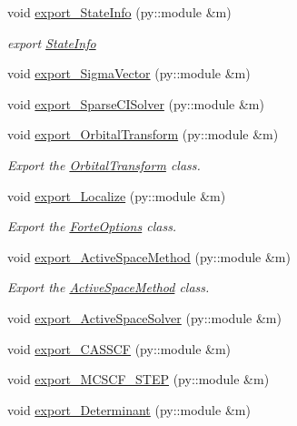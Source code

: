 \begin{DoxyCompactItemize}
void \mbox{\hyperlink{namespaceforte_aa8c5682e4ff2b32f1fe2b3473f1a770b}{export\+\_\+\+State\+Info}} (py\+::module \&m)
\begin{DoxyCompactList}\small\item\em export \mbox{\hyperlink{classforte_1_1_state_info}{State\+Info}} \end{DoxyCompactList}\item 
void \mbox{\hyperlink{namespaceforte_a9f2bc553016280d8fa1052f17e0b1080}{export\+\_\+\+Sigma\+Vector}} (py\+::module \&m)
\item 
void \mbox{\hyperlink{namespaceforte_aab5ce189063e0b0204b02b4499119d74}{export\+\_\+\+Sparse\+C\+I\+Solver}} (py\+::module \&m)
\item 
void \mbox{\hyperlink{namespaceforte_ad6203980379ae5def51dc49fb3ab9cc1}{export\+\_\+\+Orbital\+Transform}} (py\+::module \&m)
\begin{DoxyCompactList}\small\item\em Export the \mbox{\hyperlink{classforte_1_1_orbital_transform}{Orbital\+Transform}} class. \end{DoxyCompactList}\item 
void \mbox{\hyperlink{namespaceforte_a8c692535b03b849c36dfbfd0272b6c3d}{export\+\_\+\+Localize}} (py\+::module \&m)
\begin{DoxyCompactList}\small\item\em Export the \mbox{\hyperlink{classforte_1_1_forte_options}{Forte\+Options}} class. \end{DoxyCompactList}\item 
void \mbox{\hyperlink{namespaceforte_aab6306844e1cd7c9cabd0d10f8c4403b}{export\+\_\+\+Active\+Space\+Method}} (py\+::module \&m)
\begin{DoxyCompactList}\small\item\em Export the \mbox{\hyperlink{classforte_1_1_active_space_method}{Active\+Space\+Method}} class. \end{DoxyCompactList}\item 
void \mbox{\hyperlink{namespaceforte_a29d21200178e2ad6086ac56ce72670da}{export\+\_\+\+Active\+Space\+Solver}} (py\+::module \&m)
\item 
void \mbox{\hyperlink{namespaceforte_a959248dd4335ce72453abbe23a362bc3}{export\+\_\+\+C\+A\+S\+S\+CF}} (py\+::module \&m)
\item 
void \mbox{\hyperlink{namespaceforte_ac1a18c60d7df44fe17c14234b9df670d}{export\+\_\+\+M\+C\+S\+C\+F\+\_\+S\+T\+EP}} (py\+::module \&m)
\item 
void \mbox{\hyperlink{namespaceforte_ae1e063749e1124563fcd7b58b570acbd}{export\+\_\+\+Determinant}} (py\+::module \&m)

\end{DoxyCompactItemize}
